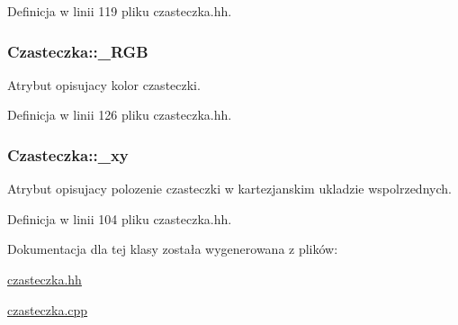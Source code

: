 Definicja w linii 119 pliku czasteczka.\-hh.

\hypertarget{class_czasteczka_ab9c93cfb3cf0360579ad0def2a94178c}{
\subsubsection[{\-\_\-\-R\-G\-B}]{ Czasteczka\-::\-\_\-\-R\-G\-B\hspace{0.3cm}{\ttfamily [private]}}}\label{class_czasteczka_ab9c93cfb3cf0360579ad0def2a94178c}
Atrybut opisujacy kolor czasteczki. 

Definicja w linii 126 pliku czasteczka.\-hh.

\hypertarget{class_czasteczka_a025a3ee895f8ee9c765814cfca1fd5e1}{
\subsubsection[{\-\_\-xy}]{ Czasteczka\-::\-\_\-xy\hspace{0.3cm}{\ttfamily [private]}}}\label{class_czasteczka_a025a3ee895f8ee9c765814cfca1fd5e1}
Atrybut opisujacy polozenie czasteczki w kartezjanskim ukladzie wspolrzednych. 

Definicja w linii 104 pliku czasteczka.\-hh.



Dokumentacja dla tej klasy została wygenerowana z plików\-:\begin{DoxyCompactItemize}
\item 
\hyperlink{czasteczka_8hh}{czasteczka.\-hh}\item 
\hyperlink{czasteczka_8cpp}{czasteczka.\-cpp}\end{DoxyCompactItemize}
